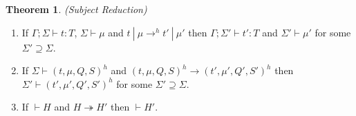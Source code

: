 \documentclass{article}
\theoremstyle{definition}
\newtheorem{thm}{Theorem}[section]
\begin{document}
\begin{thm}
\emph{(Subject Reduction)}\label{th:pres}

\begin{enumerate}

\item If $\Gamma ; \Sigma \vdash t : T$, $\Sigma \vdash \mu$ and $t~|~\mu \rightarrow^h t'~|~\mu'$ then $\Gamma ; \Sigma' \vdash t' : T$ and $\Sigma' \vdash \mu'$ for some $\Sigma' \supseteq \Sigma$.

\item If $\Sigma \vdash (t, \mu, Q, S)^h$ and $(t, \mu, Q, S)^h \longrightarrow (t', \mu', Q', S')^h$ then $\Sigma' \vdash (t', \mu', Q', S')^h$ for some $\Sigma' \supseteq \Sigma$.

\item If $\vdash H$ and $H \twoheadrightarrow H'$ then $\vdash H'$.

\end{enumerate}

\end{thm}
\end{document}
